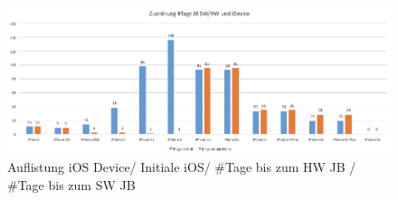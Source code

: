 \begin{figure}[htbp]
        \centering
                \includegraphics[scale=0.4]{Bilder/iDeviceJB-SW-HW.png}
         \caption{Auflistung iOS Device/ Initiale iOS/ \#Tage bis zum HW JB / \#Tage bis zum SW JB}
        \label{tab:AuflistungDeviceHWiOS}      
\end{figure}



